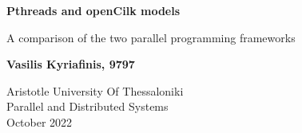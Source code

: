 \author{Vasilis Kyriafinis \\ email: \href{mailto:vakyriaf@ece.auth.gr}{vakyriaf@ece.auth.gr}} 

\makeatletter
\begin{titlepage}
    \begin{center}
        \vspace*{4cm}
 
        \textbf{\Large{Pthreads and openCilk models}}
 
        \vspace{0.5cm}
        \large{A comparison of the two parallel programming frameworks}
             
        \vspace{1cm}
 
        \textbf{Vasilis Kyriafinis, 9797}
 
        \vfill
                                
        Aristotle University Of Thessaloniki\\
        Parallel and Distributed Systems\\
        October 2022
        \vspace*{0cm}
             
    \end{center}
\end{titlepage}